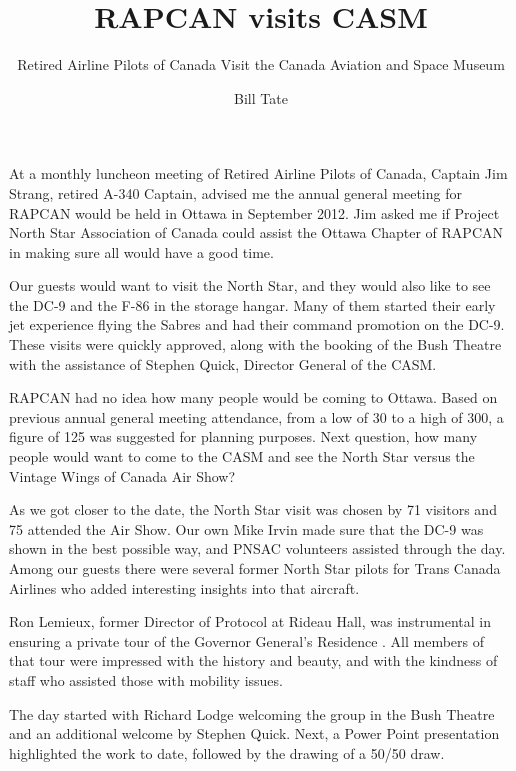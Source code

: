 %


\title{RAPCAN visits CASM}
\subtitle{Retired Airline Pilots of Canada Visit the Canada Aviation and
  Space Museum}
\author{Bill Tate}

\maketitle

At a monthly luncheon meeting of Retired Airline Pilots of Canada,
Captain Jim Strang, retired A-340 Captain, advised me the annual
general meeting for RAPCAN would be held in Ottawa in September
2012. Jim asked me if Project North Star Association of Canada could
assist the Ottawa Chapter of RAPCAN in making sure all would have a
good time.

Our guests would want to visit the North Star, and they would also
like to see the DC-9 and the F-86 in the storage hangar. Many of them
started their early jet experience flying the Sabres and had their
command promotion on the DC-9. These visits were quickly approved,
along with the booking of the Bush Theatre with the assistance of
Stephen Quick, Director General of the CASM.

RAPCAN had no idea how many people would be coming to Ottawa. Based on
previous annual general meeting attendance, from a low of 30 to a high
of 300, a figure of 125 was suggested for planning purposes. Next
question, how many people would want to come to the CASM and see the
North Star versus the Vintage Wings of Canada Air Show?

As we got closer to the date, the North Star visit was chosen by 71
visitors and 75 attended the Air Show. Our own Mike Irvin made sure
that the DC-9 was shown in the best possible way, and PNSAC volunteers
assisted through the day. Among our guests there were several former
North Star pilots for Trans Canada Airlines who added interesting
insights into that aircraft.

Ron Lemieux, former Director of Protocol at Rideau Hall, was
instrumental in ensuring a private tour of the Governor General's
Residence . All members of that tour were impressed with the history
and beauty, and with the kindness of staff who assisted those with
mobility issues.

The day started with Richard Lodge welcoming the group in the Bush
Theatre and an additional welcome by Stephen Quick. Next, a Power
Point presentation highlighted the work to date, followed by the
drawing of a 50/50 draw.

